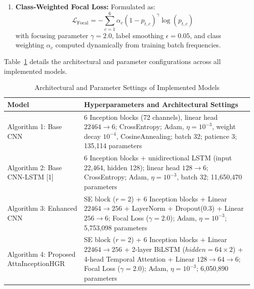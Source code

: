 \documentclass[conference]{IEEEtran}
\begin{document}
\begin{enumerate}
\begin{equation}
    \end{equation}
    \begin{equation}
    \mathbf{Z} = \operatorname{LayerNorm}\left(\mathbf{H} + \operatorname{MHA}(\mathbf{H}, \mathbf{H}, \mathbf{H})\right)
    \end{equation}
    \item \textbf{Class-Weighted Focal Loss:} Formulated as:
    \begin{equation}
    \mathcal{L}_{\text{Focal}} = -\sum_{c=1}^6 \alpha_c (1 - p_{t,c})^\gamma \log(p_{t,c})
    \end{equation}
    with focusing parameter $\gamma = 2.0$, label smoothing $\epsilon = 0.05$, and class weighting $\alpha_c$ computed dynamically from training batch frequencies.
\end{enumerate}

Table~\ref{tab:param_settings} details the architectural and parameter configurations across all implemented models.

\begin{table}[h]
\centering
\caption{Architectural and Parameter Settings of Implemented Models}
\label{tab:param_settings}
\begin{tabular}{p{2.2cm}p{5.6cm}}
\toprule
\textbf{Model} & \textbf{Hyperparameters and Architectural Settings} \\
\midrule
Algorithm 1: Base CNN & 6 Inception blocks (72 channels), linear head $22464 \to 6$; CrossEntropy; Adam, $\eta=10^{-3}$, weight decay $10^{-4}$, CosineAnnealing; batch 32; patience 3; 135,114 parameters \\
Algorithm 2: Base CNN-LSTM [1] & 6 Inception blocks + unidirectional LSTM (input 22,464, hidden 128); linear head $128 \to 6$; CrossEntropy; Adam, $\eta=10^{-3}$, batch 32; 11,650,470 parameters \\
Algorithm 3: Enhanced CNN & SE block ($r=2$) + 6 Inception blocks + Linear $22464 \to 256$ + LayerNorm + Dropout(0.3) + Linear $256 \to 6$; Focal Loss ($\gamma=2.0$); Adam, $\eta=10^{-3}$; 5,753,098 parameters \\
Algorithm 4: Proposed AttnInceptionHGR & SE block ($r=2$) + 6 Inception blocks + Linear $22464 \to 256$ + 2-layer BiLSTM ($hidden=64\times2$) + 4-head Temporal Attention + Linear $128 \to 64 \to 6$; Focal Loss ($\gamma=2.0$); Adam, $\eta=10^{-3}$; 6,050,890 parameters \\
\bottomrule
\end{tabular}
\end{table}
\end{document}
